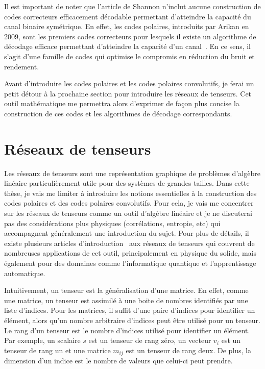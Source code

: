 Il est important de noter que l'article de Shannon n'inclut aucune construction de codes 
correcteurs efficacement décodable permettant d'atteindre la capacité du canal binaire symétrique.
En effet, les codes polaires, introduits par Arikan en 2009,
sont les premiers codes correcteurs pour lesquels 
il existe un algorithme de décodage efficace permettant d'atteindre 
la capacité d'un canal~\cite{arikan_channel_2009}. 
En ce sens, il s'agit d'une famille de codes qui optimise le compromis en réduction du bruit 
et rendement.

Avant d'introduire les codes polaires et les codes polaires convolutifs,
je ferai un petit détour à la prochaine section pour introduire les réseaux de tenseurs.
Cet outil mathématique me permettra alors d'exprimer de façon plus concise la construction
de ces codes et les algorithmes de décodage correspondants.

\section{Réseaux de tenseurs}
\label{sec:reseaux_tenseurs}

Les réseaux de tenseurs sont une représentation graphique de problèmes d'algèbre linéaire
particulièrement utile pour des systèmes de grandes tailles.
Dans cette thèse, 
je vais me limiter à introduire les notions essentielles à la construction des 
codes polaires et des codes polaires convolutifs.
Pour cela, 
je vais me concentrer sur les réseaux de tenseurs comme un outil d'algèbre linéaire 
et je ne discuterai pas des considérations plus physiques (corrélations, entropie, etc) 
qui accompagnent généralement une introduction du sujet.
Pour plus de détails,
il existe plusieurs articles d'introduction~\cite{bridgeman_hand-waving_2017, baker_methodes_2021}
aux réseaux de tenseurs qui couvrent de nombreuses applications de cet outil, principalement en physique du solide,
mais également pour des domaines comme l'informatique quantique et l'apprentissage automatique. 

Intuitivement, 
un tenseur est la généralisation d'une matrice.
En effet,
comme une matrice, 
un tenseur est assimilé à une boite de nombres identifiés par une liste d'indices. 
Pour les matrices,
il suffit d'une paire d'indices pour identifier un élément,
alors qu'un nombre arbitraire d'indices peut être utilisé pour un tenseur. 
Le rang d'un tenseur est le nombre d'indices utilisé pour identifier un élément.
Par exemple, 
un scalaire $s$ est un tenseur de rang zéro, 
un vecteur $v_i$ est un tenseur de rang un 
et une matrice $m_{ij}$ est un tenseur de rang deux.
De plus,
la dimension d'un indice est le nombre de valeurs que celui-ci peut prendre.


